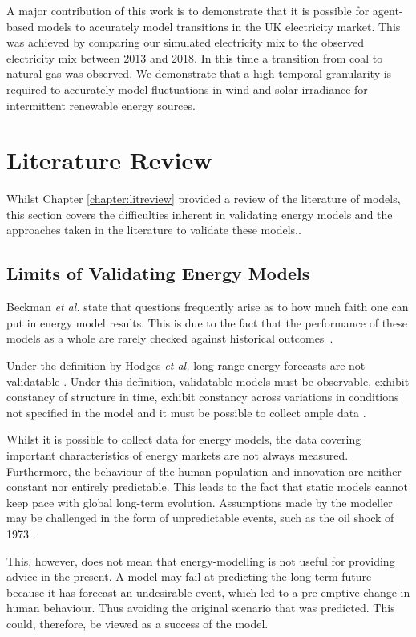 A major contribution of this work is to demonstrate that it is possible for agent-based models to accurately model transitions in the UK electricity market. This was achieved by comparing our simulated electricity mix to the observed electricity mix between 2013 and 2018. In this time a transition from coal to natural gas was observed. We demonstrate that a high temporal granularity is required to accurately model fluctuations in wind and solar irradiance for intermittent renewable energy sources.



\section{Literature Review}


Whilst Chapter \ref{chapter:litreview} provided a review of the literature of models, this section covers the difficulties inherent in validating energy models and the approaches taken in the literature to validate these models..

\subsection{Limits of Validating Energy Models}

Beckman \textit{et al.} state that questions frequently arise as to how much faith one can put in energy model results. This is due to the fact that the performance of these models as a whole are rarely checked against historical outcomes~\cite{Beckman2011}.


Under the definition by Hodges \textit{et al.} \cite{Hodges} long-range energy forecasts are not validatable \cite{Craig2002}. Under this definition, validatable models must be observable, exhibit constancy of structure in time, exhibit constancy across variations in conditions not specified in the model and it must be possible to collect ample data \cite{Hodges}.


Whilst it is possible to collect data for energy models, the data covering important characteristics of energy markets are not always measured. Furthermore, the behaviour of the human population and innovation are neither constant nor entirely predictable. This leads to the fact that static models cannot keep pace with global long-term evolution. Assumptions made by the modeller may be challenged in the form of unpredictable events, such as the oil shock of 1973 \cite{Craig2002}.

This, however, does not mean that energy-modelling is not useful for providing advice in the present. A model may fail at predicting the long-term future because it has forecast an undesirable event, which led to a pre-emptive change in human behaviour. Thus avoiding the original scenario that was predicted. This could, therefore, be viewed as a success of the model.

